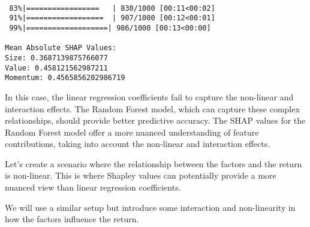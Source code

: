 \documentclass[
  letterpaper,
  DIV=11,
  numbers=noendperiod]{scrartcl}
\begin{document}
\begin{verbatim}

 83%|=================   | 830/1000 [00:11<00:02]       
 91%|==================  | 907/1000 [00:12<00:01]       
 99%|===================| 986/1000 [00:13<00:00]       

Mean Absolute SHAP Values:
Size: 0.3687139875766077
Value: 0.458121562987211
Momentum: 0.4565856202986719
\end{verbatim}

In this case, the linear regression coefficients fail to capture the
non-linear and interaction effects. The Random Forest model, which can
capture these complex relationships, should provide better predictive
accuracy. The SHAP values for the Random Forest model offer a more
nuanced understanding of feature contributions, taking into account the
non-linear and interaction effects.

Let's create a scenario where the relationship between the factors and
the return is non-linear. This is where Shapley values can potentially
provide a more nuanced view than linear regression coefficients.

We will use a similar setup but introduce some interaction and
non-linearity in how the factors influence the return.
\end{document}
